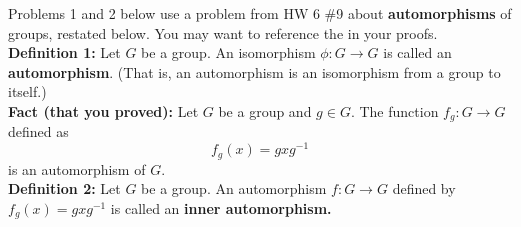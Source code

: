 \documentclass[12pt]{article}
\renewcommand{\emph}[1]{\textsf{\textbf{#1}}}
\begin{document}
Problems 1 and 2 below use a problem from HW 6 \#9 about \emph{automorphisms} of groups, restated below. You may want to reference the  in your proofs.\\

\textbf{Definition 1:} Let $G$ be a group. An isomorphism $\phi: G \to G$ is called an \emph{automorphism}. (That is, an automorphism is an isomorphism from a group to itself.)\\

\textbf{Fact (that you proved):} Let $G$ be a group and $g \in G.$ The function $f_g: G \to  G$ defined as 
$$f_g(x)=gxg^{-1}$$ is an automorphism of $G.$\\ 

\textbf{Definition 2:} Let $G$ be a group. An {automorphism} $f:G \to G$ defined by $f_g(x)=gxg^{-1}$ is called an \emph{inner automorphism.} \\
\end{document}
